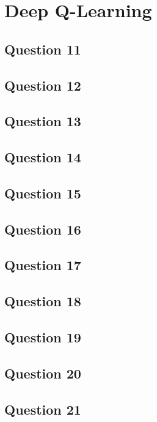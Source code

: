 \documentclass[10pt]{IEEEtran}
\begin{document}
\section{Deep Q-Learning}
\subsection*{Question 11}
\subsection*{Question 12}
\subsection*{Question 13}
\subsection*{Question 14}
\subsection*{Question 15}
\subsection*{Question 16}
\subsection*{Question 17}
\subsection*{Question 18}
\subsection*{Question 19}
\subsection*{Question 20}
\subsection*{Question 21}

\nocite{*}
\printbibliography

\clearpage
{}
\end{document}

